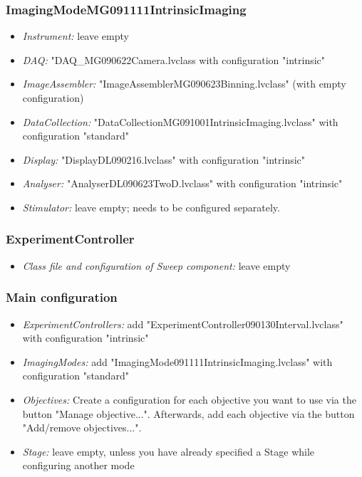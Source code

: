 \subsubsection{ImagingModeMG091111IntrinsicImaging}
\begin{itemize}[noitemsep]
	\item \textit{Instrument:} leave empty
	\item \textit{DAQ:} "DAQ_MG090622Camera.lvclass with configuration "intrinsic"
	\item \textit{ImageAssembler:} "ImageAssemblerMG090623Binning.lvclass" (with empty configuration)
	\item \textit{DataCollection:} "DataCollectionMG091001IntrinsicImaging.lvclass" with configuration "standard"
	\item \textit{Display:} "DisplayDL090216.lvclass" with configuration "intrinsic"
	\item \textit{Analyser:} "AnalyserDL090623TwoD.lvclass" with configuration "intrinsic"
	\item \textit{Stimulator:} leave empty; needs to be configured separately.
\end{itemize}

\subsubsection{ExperimentController}\label{sec:intrinsic_configuration_experimentController}
\begin{itemize}[noitemsep]
	\item \textit{Class file and configuration of Sweep component:} leave empty
\end{itemize}

\subsubsection{Main configuration}
\begin{itemize}[noitemsep]
    \item \textit{ExperimentControllers:} add "ExperimentController090130Interval.lvclass" with configuration "intrinsic"
    \item \textit{ImagingModes:} add "ImagingMode091111IntrinsicImaging.lvclass" with configuration "standard"
    \item \textit{Objectives:} Create a configuration for each objective you want to use via the button "Manage objective...". Afterwards, add each objective via the button "Add/remove objectives...". 
    \item \textit{Stage:} leave empty, unless you have already specified a Stage while configuring another mode
\end{itemize}

